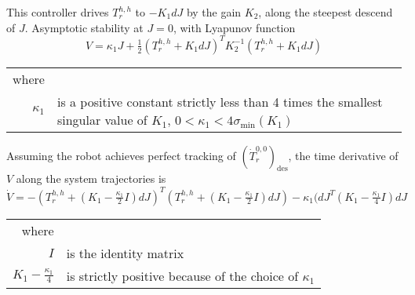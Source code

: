 This controller drives $T^{h,h}_r$ to $-K_1dJ$ by the gain $K_2$, along the steepest descend of $J$. Asymptotic stability at $J=0$, with Lyapunov function
\begin{equation}
V=\kappa_1 J + \tfrac{1}{2} (T^{h,h}_r + K_1dJ)^T K_2^{-1}(T^{h,h}_r + K_1dJ)
\end{equation}
\begin{tabular}{rl}
	where & \\
	$\kappa_1$ & is a positive constant strictly less than 4 times the smallest singular value of $K_1$, $0<\kappa_1 <4\sigma_\text{min}(K_1)$
\end{tabular}

Assuming the robot achieves perfect tracking of $\left(\dot{T}^{0,0}_r\right)_\text{des}$, the time derivative of $V$ along the system trajectories is
\begin{equation}
\dot{V} = -\left(T^{h,h}_r + (K_1 - \tfrac{\kappa_1}{2}I)dJ\right)^T \left(T^{h,h}_r + (K_1 - \tfrac{\kappa_1}{2}I)dJ\right) - \kappa_1(dJ ^T(K_1 - \tfrac{\kappa_1}{4}I)dJ
\end{equation}
\begin{tabular}{rl}
	where & \\
	$I$ & is the identity matrix\\
	$K_1 - \tfrac{\kappa_1}{4}$ & is strictly positive because of the choice of $\kappa_1$\\
\end{tabular}